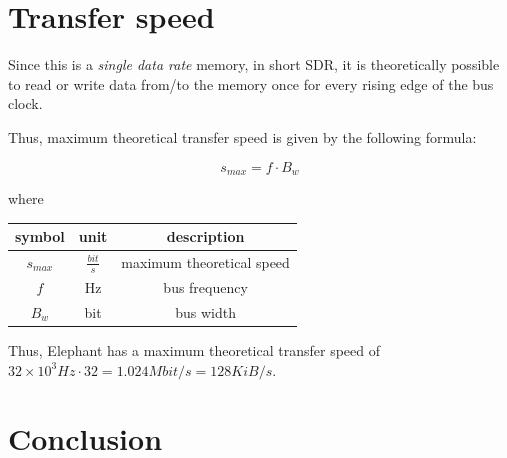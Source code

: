 \documentclass[a4paper,12pt]{article}
\newcommand{\memoryname}{Elephant}
\begin{document}
\section{Transfer speed}
Since this is a \emph{single data rate} memory, in short SDR, it is theoretically possible to read or write data from/to the memory once for every rising edge of the bus clock.

Thus, maximum theoretical transfer speed is given by the following formula:

$$ s_{max} =  f \cdot B_w $$

where

\bgroup
\def\arraystretch{1.5}
\begin{table}[H]
\center
\begin{tabular}{| c | c | c |}\hline
\textbf{symbol} & \textbf{unit} & \textbf{description} \\ \hline
$ s_{max} $ & $ \frac{bit}{s} $ & maximum theoretical speed \\ \hline
$ f $ & Hz & bus frequency \\ \hline
$ B_{w} $ & bit & bus width \\ \hline
\end{tabular}
\end{table}
\egroup

Thus, \memoryname{} has a maximum theoretical transfer speed of $32 \times 10^{3} Hz \cdot 32 = 1.024 Mbit/s = 128 KiB/s $.

\section{Conclusion}
\end{document}

